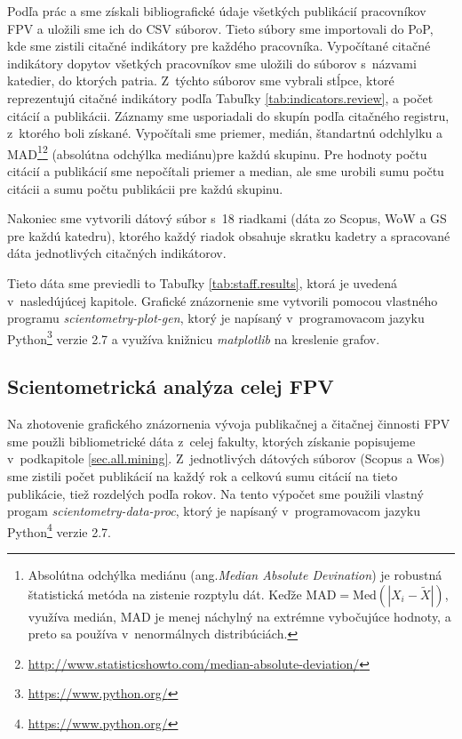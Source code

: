 Podľa prác \citet{Kazakis2014a} a \citet{Kazakis2014b,Kazakis2015} sme získali
bibliografické údaje všetkých publikácií pracovníkov FPV a uložili sme ich do
CSV súborov. Tieto súbory sme importovali do PoP, kde sme zistili citačné
indikátory pre každého pracovníka. Vypočítané citačné indikátory dopytov
všetkých pracovníkov sme uložili do súborov s~názvami katedier, do ktorých
patria. Z~týchto súborov sme vybrali stĺpce, ktoré reprezentujú citačné
indikátory podľa Tabuľky \ref{tab:indicators.review}, a počet citácií a
publikácii.  Záznamy sme usporiadali do skupín podľa citačného registru,
z~ktorého boli získané.  Vypočítali sme priemer, medián, štandartnú odchlylku a
MAD\footnote{Absolútna odchýlka mediánu (ang.\emph{Median Absolute Devination})
je robustná štatistická metóda na zistenie rozptylu dát. Keďže $\mathrm{MAD} =
\mathrm{Med}(|X_i - \tilde{X}|)$, využíva medián, MAD je menej náchylný na
extrémne vybočujúce hodnoty, a preto sa používa v~nenormálnych
distribúciách.}\footnote{\url{http://www.statisticshowto.com/median-absolute-deviation/}}
(absolútna odchýlka mediánu)pre každú skupinu. Pre hodnoty počtu citácií a
publikácií sme nepočítali priemer a median, ale sme urobili sumu počtu citácii
a sumu počtu publikácii pre každú skupinu.

Nakoniec sme vytvorili dátový súbor s~18 riadkami (dáta zo Scopus, WoW a GS
pre každú katedru), ktorého každý riadok obsahuje skratku kadetry a spracované
dáta jednotlivých citačných indikátorov.

Tieto dáta sme previedli to Tabuľky \ref{tab:staff.results}, ktorá je
uvedená v~nasledújúcej kapitole. Grafické znázornenie sme vytvorili pomocou
vlastného programu \emph{scientometry-plot-gen}, ktorý je napísaný
v~programovacom jazyku Python\footnote{\url{https://www.python.org/}} verzie 2.7
a využíva knižnicu \emph{matplotlib} na kreslenie grafov.


\subsection{Scientometrická analýza celej FPV}

Na zhotovenie grafického znázornenia vývoja publikačnej a čitačnej činnosti FPV
sme použli bibliometrické dáta z~celej fakulty, ktorých získanie popisujeme
v~podkapitole \ref{sec.all.mining}. Z~jednotlivých dátových súborov (Scopus a Wos)
sme zistili počet publikácií na každý rok  a celkovú sumu citácií na tieto
publikácie, tiež rozdelých podľa rokov. Na tento výpočet sme použili vlastný
progam \emph{scientometry-data-proc}, ktorý je napísaný v~programovacom jazyku
Python\footnote{\url{https://www.python.org/}} verzie 2.7.

